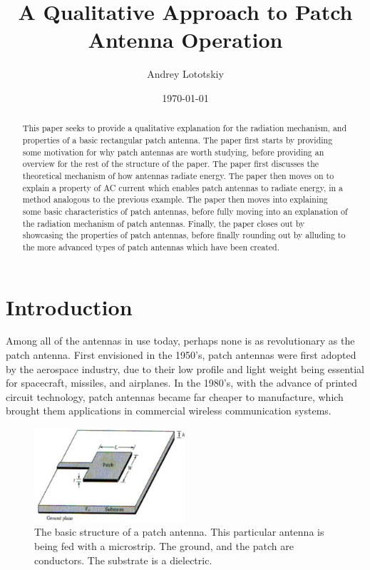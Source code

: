 \documentclass[12pt]{article}
\title{A Qualitative Approach to Patch Antenna Operation}
\author{Andrey Lototskiy}
\date{\today}
\begin{document}
\maketitle

\begin{abstract}
This paper seeks to provide a qualitative explanation for the radiation mechanism, and properties of a basic rectangular patch antenna. The paper first starts by providing some motivation for why patch antennas are worth studying, before providing an overview for the rest of the structure of the paper. The paper first discusses the theoretical mechanism of how antennas radiate energy. The paper then moves on to explain a property of AC current which enables patch antennas to radiate energy, in a method analogous to the previous example. The paper then moves into explaining some basic characteristics of patch antennas, before fully moving into an explanation of the radiation mechanism of patch antennas. Finally, the paper closes out by showcasing the properties of patch antennas, before finally rounding out by alluding to the more advanced types of patch antennas which have been created.
\end{abstract}

\section{Introduction}
Among all of the antennas in use today, perhaps none is as revolutionary as the patch antenna. First envisioned in the 1950's\cite{gutton1955flat}, patch antennas were first adopted by the aerospace industry\cite{balanis2016antenna}, due to their low profile and light weight being essential for spacecraft, missiles, and airplanes. In the 1980's, with the advance of printed circuit technology, patch antennas became far cheaper to manufacture\cite{khan2015microstrip}, which brought them applications in commercial wireless communication systems.  

\begin{figure}[h]
    \centering
    \includegraphics[width=0.5\textwidth]{patch-antenna-structure.png}
    \caption{The basic structure of a patch antenna. This particular antenna is being fed with a microstrip. The ground, and the patch are conductors. The substrate is a dielectric. \cite{girase2014design}}
\end{figure}
\end{document}
